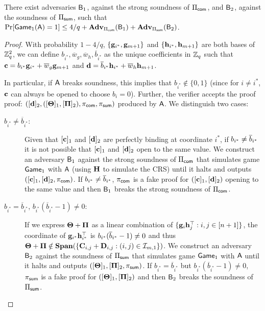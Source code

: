 \begin{lemma}
There exist adversaries $\mathsf{B}_1$, against the strong soundness of $\Pi_{\mathsf{com}}$, and $\mathsf{B}_2$, against the soundness of $\Pi_{\mathsf{sum}}$, such that $\Pr[\mathsf{Game}_1(\mathsf{A})=1]\leq 4/q+ \mathbf{Adv}_{\Pi_{\mathsf{com}}}(\mathsf{B}_1)+\mathbf{Adv}_{\Pi_{\mathsf{sum}}}(\mathsf{B}_2)$.
\end{lemma}
\begin{proof}
With probability $1-4/q$, $\{\mathbf{g}_{i^*},\mathbf{g}_{m+1}\}$ and $\{\mathbf{h}_{i^*},\mathbf{h}_{m+1}\}$ are both bases of $\mathbb{Z}_q^2$,
we can define $b_{i^*},\overline{w}_g,\overline{w}_h,\overline{b}_{i^*}$ as the unique coefficients in $\mathbb{Z}_q$ such that $\mathbf{c}=b_{i^*}\mathbf{g}_{i^*} + \overline{w}_g \mathbf{g}_{m+1}$ and $\mathbf{d}= \overline{b}_{i^*} \mathbf{h}_{i^*} + \overline{w}_h \mathbf{h}_{m+1}$.

In particular, if $\mathsf{A}$ breaks soundness, this implies that $b_{i^*} \notin \{0,1\}$ (since for $i\neq i^*$, 
$\mathbf{c}$ can always be opened to 
  choose $b_i=0$). Further, the verifier accepts the proof proof:
$ (
        [\mathbf{d}]_2,
        ([\mathbf{{\Theta}}]_1, [\mathbf{{\Pi}}]_2), 
        \pi_{\mathsf{com}},\pi_{\mathsf{sum}} )$
  produced by $\mathsf{A}$.
We distinguish two cases:
\begin{description}
\item[$b_{i^*} \neq \overline{b}_{i^*}$:] Given that $[\mathbf{c}]_1$ and $[\mathbf{d}]_2$ are perfectly binding at coordinate $i^*$, if $b_{i^*}\neq\overline{b}_{i^*}$ it is not possible that $[\mathbf{c}]_1$ and $[\mathbf{d}]_2$ open to the same value. We construct an adversary $\mathsf{B}_1$ against the strong soundness 
of $\Pi_{\mathsf{com}}$ that simulates game $\mathsf{Game}_1$ with $\mathsf{A}$ (using $\mathbf{{H}}$ to simulate the CRS) until it halts and outputs $([\mathbf{c}]_1,[\mathbf{d}]_2,\pi_{\mathsf{com}})$. If $b_{i^*}\neq\overline{b}_{i^*}$, $\pi_{\mathsf{com}}$ is a fake proof for $([\mathbf{c}]_1,[\mathbf{d}]_2)$ opening to the same value and then $\mathsf{B}_1$ breaks the strong soundness of $\Pi_{\mathsf{com}}$.
\item[$b_{i^*} = \overline{b}_{i^*}$, 
$b_{i^*}(\overline{b}_{i^*} -1) \neq 0$:]
If we express $\mathbf{{\Theta}}+\mathbf{{\Pi}}$
as a linear combination of $\{\mathbf{g}_{i}\mathbf{h}_{j}^{\top}:i,j\in[n+1]\}$, the coordinate of
$\mathbf{g}_{i^*}\mathbf{h}_{i^*}^\top$ is $b_{i^*}(\overline{b}_{i^*}-1)\neq 0$ and thus $\mathbf{{\Theta}}+\mathbf{{\Pi}}\notin\mathbf{Span}(\{\mathbf{{C}}_{i,j}+\mathbf{{D}}_{i,j}:(i,j)\in\mathcal{I}_{m,1}\})$. We construct an adversary $\mathsf{B}_2$ against the soundness of $\Pi_{\mathsf{sum}}$ that simulates game $\mathsf{Game}_1$ with $\mathsf{A}$ until it halts and outputs $([\mathbf{{\Theta}}]_1,[\mathbf{{\Pi}}]_2,\pi_{\mathsf{sum}})$. If $b_{i^*} = \overline{b}_{i^*}$ but $b_{i^*}(\overline{b}_{i^*} -1) \neq 0$, $\pi_{\mathsf{sum}}$ is a fake proof for $([\mathbf{{\Theta}}]_1,[\mathbf{{\Pi}}]_2)$ and then $\mathsf{B}_2$ breaks the soundness of $\Pi_{\mathsf{sum}}$.
\end{description}
\end{proof}

